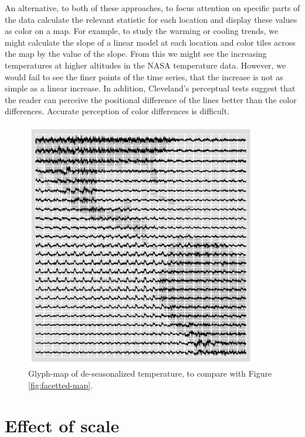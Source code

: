 \documentclass[oneside]{article}
\begin{document}
An alternative, to both of these approaches, to focus attention on specific parts of the data calculate the relevant statistic for each location and display these values as color on a map. For example, to study the warming or cooling trends, we might calculate the slope of a linear model at each location and color tiles across the map by the value of the slope. From this we might see the increasing temperatures at higher altitudes in the NASA temperature data. However, we would fail to see the finer points of the time series, that the increase is not as simple as a linear increase. In addition, Cleveland's \citep{cleveland:1993a} perceptual tests suggest that the reader can perceive the positional difference of the lines better than the color differences. Accurate perception of color differences is difficult.

\begin{figure}[htp]
\centerline{\includegraphics[width=4in]{nasa-deseas-glyph.png}}
\caption{Glyph-map of de-seasonalized temperature, to compare with Figure \ref{fig:facetted-map}. }
\label{fig:nasa-deseas-glyph}
\end{figure}


\section{Effect of scale}~\label{sec:scale}

\end{document}
